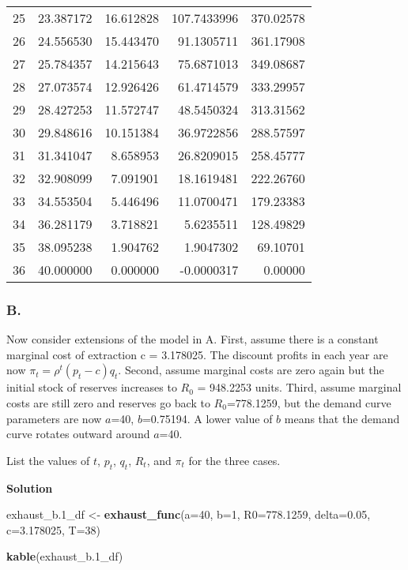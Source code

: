 \documentclass[
]{article}
\newenvironment{Shaded}{\begin{snugshade}}{\end{snugshade}}
\newcommand{\AttributeTok}[1]{\textcolor[rgb]{0.13,0.29,0.53}{#1}}
\newcommand{\DecValTok}[1]{\textcolor[rgb]{0.00,0.00,0.81}{#1}}
\newcommand{\FloatTok}[1]{\textcolor[rgb]{0.00,0.00,0.81}{#1}}
\newcommand{\FunctionTok}[1]{\textcolor[rgb]{0.13,0.29,0.53}{\textbf{#1}}}
\newcommand{\NormalTok}[1]{#1}
\newcommand{\OtherTok}[1]{\textcolor[rgb]{0.56,0.35,0.01}{#1}}
\begin{document}
\begin{longtable}[]{@{}rrrrr@{}}
25 & 23.387172 & 16.612828 & 107.7433996 & 370.02578 \\
26 & 24.556530 & 15.443470 & 91.1305711 & 361.17908 \\
27 & 25.784357 & 14.215643 & 75.6871013 & 349.08687 \\
28 & 27.073574 & 12.926426 & 61.4714579 & 333.29957 \\
29 & 28.427253 & 11.572747 & 48.5450324 & 313.31562 \\
30 & 29.848616 & 10.151384 & 36.9722856 & 288.57597 \\
31 & 31.341047 & 8.658953 & 26.8209015 & 258.45777 \\
32 & 32.908099 & 7.091901 & 18.1619481 & 222.26760 \\
33 & 34.553504 & 5.446496 & 11.0700471 & 179.23383 \\
34 & 36.281179 & 3.718821 & 5.6235511 & 128.49829 \\
35 & 38.095238 & 1.904762 & 1.9047302 & 69.10701 \\
36 & 40.000000 & 0.000000 & -0.0000317 & 0.00000 \\
\end{longtable}

\hypertarget{b.}{%
\subsubsection{B.}\label{b.}}

Now consider extensions of the model in A. First, assume there is a
constant marginal cost of extraction c = 3.178025. The discount profits
in each year are now \(\pi_t=\rho^t (p_t-c)q_t\). Second, assume
marginal costs are zero again but the initial stock of reserves
increases to \(R_0\) = 948.2253 units. Third, assume marginal costs are
still zero and reserves go back to \(R_0\)=778.1259, but the demand
curve parameters are now \(a\)=40, \(b\)=0.75194. A lower value of \(b\)
means that the demand curve rotates outward around \(a\)=40.

List the values of \(t\), \(p_t\), \(q_t\), \(R_t\), and \(\pi_t\) for
the three cases.

{\textbf{Solution}}

\begin{Shaded}
\begin{Highlighting}[]
\NormalTok{exhaust\_b}\FloatTok{.1}\NormalTok{\_df }\OtherTok{\textless{}{-}} \FunctionTok{exhaust\_func}\NormalTok{(}\AttributeTok{a=}\DecValTok{40}\NormalTok{, }\AttributeTok{b=}\DecValTok{1}\NormalTok{, }\AttributeTok{R0=}\FloatTok{778.1259}\NormalTok{, }\AttributeTok{delta=}\FloatTok{0.05}\NormalTok{, }\AttributeTok{c=}\FloatTok{3.178025}\NormalTok{, }\AttributeTok{T=}\DecValTok{38}\NormalTok{)}

\FunctionTok{kable}\NormalTok{(exhaust\_b}\FloatTok{.1}\NormalTok{\_df)}
\end{Highlighting}
\end{Shaded}
\end{document}
